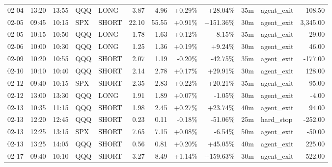 \documentclass[11pt,a4paper,twoside]{article}
\begin{document}
\begin{center}
\begin{longtable}{>{\color{txtmain}}l l l l l r r r r r >{\color{txtmain}}l r}
02-04 & 13:20 & 13:55 & QQQ & LONG & 3.87 & 4.96 & \textcolor{wingreen}{+0.29\%} & \textcolor{wingreen}{+28.04\%} & 35m & agent\_exit & \textcolor{wingreen}{108.50} \\
02-05 & 09:45 & 10:15 & SPX & SHORT & 22.10 & 55.55 & \textcolor{wingreen}{+0.91\%} & \textcolor{wingreen}{+151.36\%} & 30m & agent\_exit & \textcolor{wingreen}{3,345.00} \\
02-05 & 10:15 & 10:50 & QQQ & LONG & 1.78 & 1.63 & \textcolor{wingreen}{+0.12\%} & \textcolor{lossred}{-8.15\%} & 35m & agent\_exit & \textcolor{lossred}{-29.00} \\
02-06 & 10:00 & 10:30 & QQQ & LONG & 1.25 & 1.36 & \textcolor{wingreen}{+0.19\%} & \textcolor{wingreen}{+9.24\%} & 30m & agent\_exit & \textcolor{wingreen}{46.00} \\
02-09 & 10:20 & 10:55 & QQQ & SHORT & 2.07 & 1.19 & \textcolor{lossred}{-0.20\%} & \textcolor{lossred}{-42.75\%} & 35m & agent\_exit & \textcolor{lossred}{-177.00} \\
02-10 & 10:10 & 10:40 & QQQ & SHORT & 2.14 & 2.78 & \textcolor{wingreen}{+0.17\%} & \textcolor{wingreen}{+29.91\%} & 30m & agent\_exit & \textcolor{wingreen}{128.00} \\
02-12 & 09:40 & 10:15 & SPX & SHORT & 2.35 & 2.83 & \textcolor{wingreen}{+0.22\%} & \textcolor{wingreen}{+20.21\%} & 35m & agent\_exit & \textcolor{wingreen}{95.00} \\
02-12 & 13:00 & 13:30 & QQQ & LONG & 1.91 & 1.89 & \textcolor{wingreen}{+0.07\%} & \textcolor{lossred}{-1.05\%} & 30m & agent\_exit & \textcolor{lossred}{-4.00} \\
02-13 & 10:35 & 11:15 & QQQ & SHORT & 1.98 & 2.45 & \textcolor{wingreen}{+0.27\%} & \textcolor{wingreen}{+23.74\%} & 40m & agent\_exit & \textcolor{wingreen}{94.00} \\
02-13 & 12:20 & 12:45 & QQQ & SHORT & 0.23 & 0.11 & \textcolor{lossred}{-0.18\%} & \textcolor{lossred}{-51.06\%} & 25m & hard\_stop & \textcolor{lossred}{-252.00} \\
02-13 & 12:25 & 13:15 & SPX & SHORT & 7.65 & 7.15 & \textcolor{wingreen}{+0.08\%} & \textcolor{lossred}{-6.54\%} & 50m & agent\_exit & \textcolor{lossred}{-50.00} \\
02-13 & 13:25 & 14:05 & QQQ & SHORT & 0.56 & 0.81 & \textcolor{wingreen}{+0.20\%} & \textcolor{wingreen}{+45.05\%} & 40m & agent\_exit & \textcolor{wingreen}{225.00} \\
02-17 & 09:40 & 10:10 & QQQ & SHORT & 3.27 & 8.49 & \textcolor{wingreen}{+1.14\%} & \textcolor{wingreen}{+159.63\%} & 30m & agent\_exit & \textcolor{wingreen}{522.00} \\

\end{longtable}
\end{center}
\end{document}
